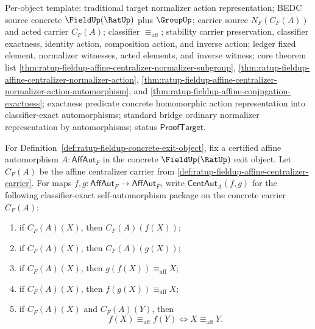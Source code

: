 Per-object template: traditional target normalizer action representation; BEDC
source concrete $\FieldUp(\RatUp)$ plus $\GroupUp$; carrier source
$N_F(C_F(A))$ and acted carrier $C_F(A)$; classifier $\equiv_{\mathrm{aff}}$;
stability carrier preservation, classifier exactness, identity action,
composition action, and inverse action; ledger fixed element, normalizer
witnesses, acted elements, and inverse witness; core theorem list
\autoref{thm:ratup-fieldup-affine-centralizer-normalizer-subgroup},
\autoref{thm:ratup-fieldup-affine-centralizer-normalizer-action},
\autoref{thm:ratup-fieldup-affine-centralizer-normalizer-action-automorphism},
and \autoref{thm:ratup-fieldup-affine-conjugation-exactness}; exactness
predicate concrete homomorphic action representation into classifier-exact
automorphisms; standard bridge ordinary normalizer representation by
automorphisms; status $\mathsf{ProofTarget}$.

\begin{definition}
\label{def:ratup-fieldup-affine-centralizer-automorphism-package}
For Definition~\ref{def:ratup-fieldup-concrete-exit-object}, fix a certified
affine automorphism $A:\mathsf{AffAut}_F$ in the concrete $\FieldUp(\RatUp)$
exit object. Let $C_F(A)$ be the affine centralizer carrier from
\autoref{def:ratup-fieldup-affine-centralizer-carrier}. For maps
$f,g:\mathsf{AffAut}_F\to\mathsf{AffAut}_F$, write
$\mathsf{CentAut}_A(f,g)$ for the following classifier-exact self-automorphism
package on the concrete carrier $C_F(A)$:
\begin{enumerate}
\item if $C_F(A)(X)$, then $C_F(A)(f(X))$;
\item if $C_F(A)(X)$, then $C_F(A)(g(X))$;
\item if $C_F(A)(X)$, then $g(f(X))\equiv_{\mathrm{aff}}X$;
\item if $C_F(A)(X)$, then $f(g(X))\equiv_{\mathrm{aff}}X$;
\item if $C_F(A)(X)$ and $C_F(A)(Y)$, then
$$
f(X)\equiv_{\mathrm{aff}}f(Y)
\Longleftrightarrow X\equiv_{\mathrm{aff}}Y.
$$
\end{enumerate}
\end{definition}

